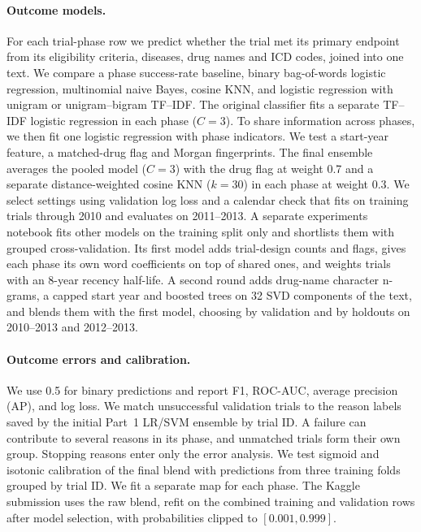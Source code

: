 \documentclass[10pt,twocolumn,letterpaper]{article}
\begin{document}
\paragraph{Outcome models.}
For each trial-phase row we predict whether the trial met its primary endpoint from its eligibility criteria, diseases, drug names and ICD codes, joined into one text. We compare a phase success-rate baseline, binary bag-of-words logistic regression, multinomial naive Bayes, cosine KNN, and logistic regression with unigram or unigram--bigram TF--IDF. The original classifier fits a separate TF--IDF logistic regression in each phase ($C=3$). To share information across phases, we then fit one logistic regression with phase indicators. We test a start-year feature, a matched-drug flag and Morgan fingerprints. The final ensemble averages the pooled model ($C=3$) with the drug flag at weight 0.7 and a separate distance-weighted cosine KNN ($k=30$) in each phase at weight 0.3. We select settings using validation log loss and a calendar check that fits on training trials through 2010 and evaluates on 2011--2013.
A separate experiments notebook fits other models on the training split only and shortlists them with grouped cross-validation. Its first model adds trial-design counts and flags, gives each phase its own word coefficients on top of shared ones, and weights trials with an 8-year recency half-life. A second round adds drug-name character n-grams, a capped start year and boosted trees on 32 SVD components of the text, and blends them with the first model, choosing by validation and by holdouts on 2010--2013 and 2012--2013.

\paragraph{Outcome errors and calibration.}
We use 0.5 for binary predictions and report F1, ROC-AUC, average precision (AP), and log loss. We match unsuccessful validation trials to the reason labels saved by the initial Part~1 LR/SVM ensemble by trial ID. A failure can contribute to several reasons in its phase, and unmatched trials form their own group. Stopping reasons enter only the error analysis. We test sigmoid and isotonic calibration of the final blend with predictions from three training folds grouped by trial ID. We fit a separate map for each phase. The Kaggle submission uses the raw blend, refit on the combined training and validation rows after model selection, with probabilities clipped to $[0.001,0.999]$.
\end{document}
